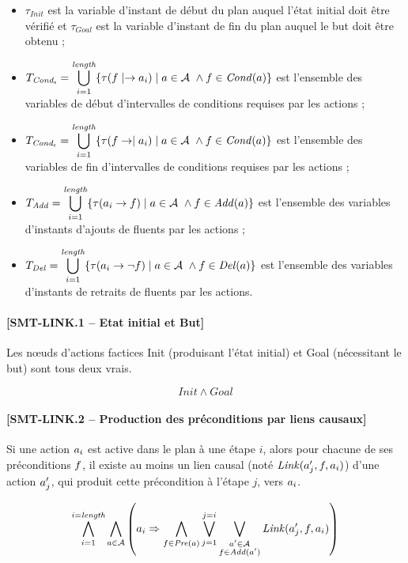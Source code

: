\begin{itemize}
\item $\tau_{\mathit{Init}}$ est la variable d'instant de début du plan auquel l'état initial doit être vérifié et $\tau_{\mathit{Goal}}$ est la variable d'instant de fin du plan auquel le but doit être obtenu ;
\item $\displaystyle T_{\mathit{Cond_{s}}}=\bigcup_{i=1}^{\textit{length}}\{\tau(f\mid\rightarrow a_{i})\mid a\in\mathcal{A}\ \wedge f\in\mathit{Cond}(a)\}$ est l'ensemble des variables de début d'intervalles de conditions requises par les actions ;
\item $\displaystyle T_{\mathit{Cond_{e}}}=\bigcup_{i=1}^{\textit{length}}\{\tau(f\rightarrow\mid a_{i})\mid a\in\mathcal{A}\ \wedge f\in\mathit{Cond}(a)\}$ est l'ensemble des variables de fin d'intervalles de conditions requises par les actions ;
\item $\displaystyle T_{\mathit{Add}}=\bigcup_{i=1}^{\textit{length}}\{\tau(a_{i}\rightarrow f)\mid a\in\mathcal{A}\ \wedge f\in\mathit{Add}(a)\}$ est l'ensemble des variables d'instants d'ajouts de fluents par les actions ;
\item $\displaystyle T_{\mathit{Del}}=\bigcup_{i=1}^{\textit{length}}\{\tau(a_{i}\rightarrow\neg f)\mid a\in\mathcal{A}\ \wedge f\in\mathit{Del}(a)\}$ est l'ensemble des variables d'instants de retraits de fluents par les actions.
\end{itemize}

\paragraph*{[SMT-LINK.1 -- Etat initial et But]}

Les nœuds d'actions factices Init (produisant l'état initial) et Goal (nécessitant le but) sont tous deux vrais.

\[
\mathit{Init} \wedge \mathit{Goal}
\]

\paragraph*{[SMT-LINK.2 -- Production des préconditions par liens causaux]}

Si une action $a_{i}$ est active dans le plan à une étape $i$, alors pour chacune de ses préconditions $f$, il existe au moins un lien causal (noté $\mathit{Link}(a'_{j},f,a_{i})$) d'une action $a'_{j}$, qui produit cette précondition à l'étape $j$, vers $a_{i}$.

\[ \bigwedge\limits_{\substack{i=1}}^{i=\textit{length}} \bigwedge\limits_{\substack{a\in\mathcal{A}}} \left( a_{i} \Rightarrow \bigwedge\limits_{\substack{f\in\mathit{Pre}(a)}} \bigvee\limits_{\substack{j=1}}^{j=i}\bigvee\limits_{\substack{a'\in\mathcal{A}\\f\in\mathit{Add}(a')}} \mathit{Link}(a'_{j},f,a_{i}) \right)
\]

